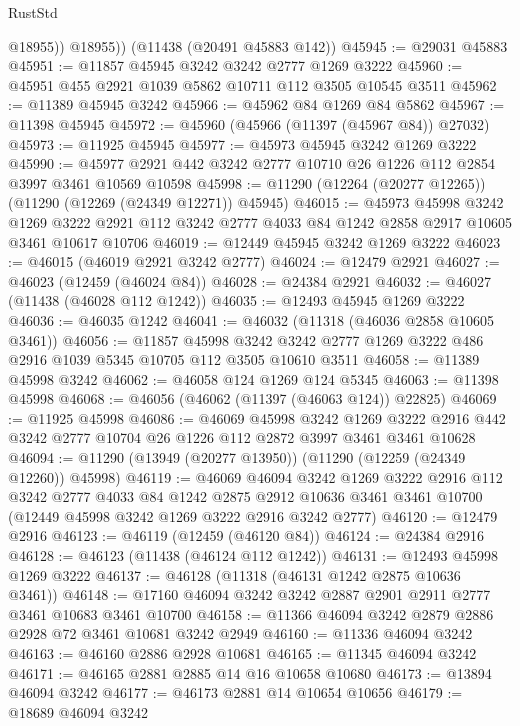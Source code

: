 \begin{lexlean}{RustStd}
\begin{coremodule}
            @18955))
        @18955))
    (@11438 (@20491 @45883 @142))
@45945 := @29031 @45883
@45951 := @11857 @45945 @3242 @3242 @2777 @1269 @3222
@45960 := @45951 @455 @2921 @1039 @5862 @10711 @112 @3505 @10545 @3511
@45962 := @11389 @45945 @3242
@45966 := @45962 @84 @1269 @84 @5862
@45967 := @11398 @45945
@45972 := @45960 (@45966 (@11397 (@45967 @84)) @27032)
@45973 := @11925 @45945
@45977 := @45973 @45945 @3242 @1269 @3222
@45990 := @45977 @2921 @442 @3242 @2777 @10710 @26 @1226 @112 @2854 @3997 @3461 @10569 @10598
@45998 := @11290 (@12264 (@20277 @12265)) (@11290 (@12269 (@24349 @12271)) @45945)
@46015 := @45973
    @45998
    @3242
    @1269
    @3222
    @2921
    @112
    @3242
    @2777
    @4033
    @84
    @1242
    @2858
    @2917
    @10605
    @3461
    @10617
    @10706
@46019 := @12449 @45945 @3242 @1269 @3222
@46023 := @46015 (@46019 @2921 @3242 @2777)
@46024 := @12479 @2921
@46027 := @46023 (@12459 (@46024 @84))
@46028 := @24384 @2921
@46032 := @46027 (@11438 (@46028 @112 @1242))
@46035 := @12493 @45945 @1269 @3222
@46036 := @46035 @1242
@46041 := @46032 (@11318 (@46036 @2858 @10605 @3461))
@46056 := @11857
    @45998
    @3242
    @3242
    @2777
    @1269
    @3222
    @486
    @2916
    @1039
    @5345
    @10705
    @112
    @3505
    @10610
    @3511
@46058 := @11389 @45998 @3242
@46062 := @46058 @124 @1269 @124 @5345
@46063 := @11398 @45998
@46068 := @46056 (@46062 (@11397 (@46063 @124)) @22825)
@46069 := @11925 @45998
@46086 := @46069
    @45998
    @3242
    @1269
    @3222
    @2916
    @442
    @3242
    @2777
    @10704
    @26
    @1226
    @112
    @2872
    @3997
    @3461
    @3461
    @10628
@46094 := @11290 (@13949 (@20277 @13950)) (@11290 (@12259 (@24349 @12260)) @45998)
@46119 := @46069
    @46094
    @3242
    @1269
    @3222
    @2916
    @112
    @3242
    @2777
    @4033
    @84
    @1242
    @2875
    @2912
    @10636
    @3461
    @3461
    @10700
    (@12449 @45998 @3242 @1269 @3222 @2916 @3242 @2777)
@46120 := @12479 @2916
@46123 := @46119 (@12459 (@46120 @84))
@46124 := @24384 @2916
@46128 := @46123 (@11438 (@46124 @112 @1242))
@46131 := @12493 @45998 @1269 @3222
@46137 := @46128 (@11318 (@46131 @1242 @2875 @10636 @3461))
@46148 := @17160 @46094 @3242 @3242 @2887 @2901 @2911 @2777 @3461 @10683 @3461 @10700
@46158 := @11366 @46094 @3242 @2879 @2886 @2928 @72 @3461 @10681 @3242 @2949
@46160 := @11336 @46094 @3242
@46163 := @46160 @2886 @2928 @10681
@46165 := @11345 @46094 @3242
@46171 := @46165 @2881 @2885 @14 @16 @10658 @10680
@46173 := @13894 @46094 @3242
@46177 := @46173 @2881 @14 @10654 @10656
@46179 := @18689 @46094 @3242

\end{coremodule}
\end{lexlean}
